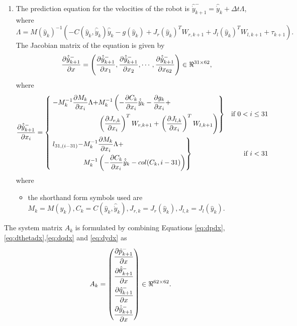 \begin{enumerate}
\item The prediction equation for the velocities of the robot is $\hat{\dot{y}}_{k+1}^- = \hat{\dot{y}}_{k}+ \Delta t \Lambda $, where 
$$\Lambda = M(\hat{y}_{k})^{-1}(-C(\hat{y}_{k},\hat{\dot{y}}_{k})\hat{\dot{y}}_{k} - g(\hat{y}_{k}) + J_r(\hat{y}_{k})^{T}W_{r,k+1} +J_l(\hat{y}_{k})^{T}W_{l,k+1} + \tau_{k+1}).$$
The Jacobian matrix of the equation is given by
 \begin{equation}
 \label{eq:dydx}
\frac{\partial {\hat{\dot{y}}_{k+1}^-}}{\partial {x}} = \left(\frac{\partial {\hat{\dot{y}}_{k+1}^-}}{\partial {x_{1}}}, \frac{\partial {\hat{\dot{y}}_{k+1}^-}}{\partial {x_{2}}}, \cdots , \frac{\partial {\hat{\dot{y}}_{k+1}^-}}{\partial {x_{62}}}\right) \in \Re^{31 \times 62},
\end{equation}
where
\[
\frac{\partial {\hat{\dot{y}}_{k+1}^-}}{\partial {x_{i}}} = 
\left\{ 
\!\begin{aligned}
	& \left. \!\begin{aligned}
	-M_k^{-1}\frac{\partial {M_k}}{\partial {x_{i}}}\Lambda + &M_k^{-1}\left(-\frac{\partial {C_k}}{\partial {x_{i}}}\hat{\dot{y}}_{k} -\frac{\partial {g_k}}{\partial {x_{i}}}+ \right. \\
	&\left(\frac{\partial {J_{r,k}}}{\partial {x_{i}}}\right)^{T}W_{r,k+1} + \left. \left(\frac{\partial {J_{l,k}}}{\partial {x_{i}}}\right)^{T}W_{l,k+1} \right)
	\end{aligned} \right\}& \text{if } 0 < i \leq 31 \\
    & \left.\!\begin{aligned}
    l_{31,(i-31)}-&M_k^{-1}\frac{\partial {M_k}}{\partial {x_{i}}}\Lambda+ \\
    &M_k^{-1}\left(-\frac{\partial {C_k}}{\partial {x_{i}}}\hat{\dot{y}}_{k}- col(C_k,i-31)\right)     
    \end{aligned} \right\} & \text{if } i < 31  \\
\end{aligned}
\right. 
\]where
\begin{itemize}
\item the shorthand form symbols used are  $M_k= M(\hat{y}_{k}),C_k=C(\hat{y}_{k},\hat{\dot{y}}_k),J_{r,k}=J_r(\hat{y}_{k}),J_{l,k}=J_l(\hat{y}_{k})$.
\end{itemize}
\end{enumerate}
The system matrix $A_k$ is formulated by combining Equations \ref{eq:dpdx},\ref{eq:dthetadx},\ref{eq:dqdx} and \ref{eq:dydx} as
\begin{equation}
\label{eq:sys_mat}
A_k = \left(
\begin{aligned}
\frac{\partial {\hat{p}_{k+1}^-}}{\partial {x}} \\
\frac{\partial {\hat{\theta}_{k+1}^-}}{\partial {x}} \\
\frac{\partial {\hat{q}_{k+1}^-}}{\partial {x}}\\
\frac{\partial {\hat{\dot{y}}_{k+1}^-}}{\partial {x}}
\end{aligned} \right)
\in \Re^{62 \times 62}.
\end{equation}


